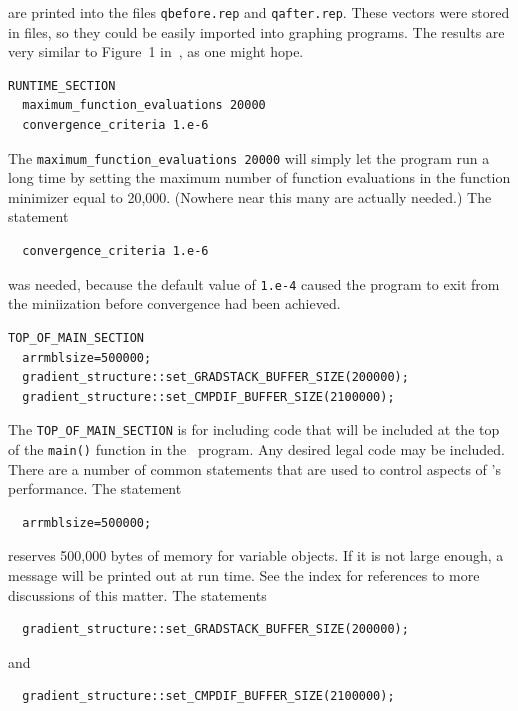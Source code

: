 \documentclass{admbmanual}
\begin{document}
are printed into the files \texttt{qbefore.rep} and \texttt{qafter.rep}.
These vectors were stored in files, so they could be easily imported into 
graphing programs. The results are very similar to Figure~1 in~\cite{hamilton1989},
 as one might hope.
\begin{lstlisting}
RUNTIME_SECTION
  maximum_function_evaluations 20000 
  convergence_criteria 1.e-6 
\end{lstlisting}
The  \texttt{maximum\_function\_evaluations 20000} will simply let the program
run a long time by setting the maximum number of function evaluations
in the function minimizer equal to 20,000. (Nowhere near this many are actually
needed.)
The statement
\begin{lstlisting}
  convergence_criteria 1.e-6
\end{lstlisting}
was needed, because the default value of \texttt{1.e-4} caused the program to 
exit from the miniization before convergence had been achieved.
\begin{lstlisting}
TOP_OF_MAIN_SECTION
  arrmblsize=500000;
  gradient_structure::set_GRADSTACK_BUFFER_SIZE(200000);
  gradient_structure::set_CMPDIF_BUFFER_SIZE(2100000);
\end{lstlisting}
The  \texttt{TOP\_OF\_MAIN\_SECTION} is for including code that
will be included at the top of the \texttt{main()} function in the
\cplus\ program. Any desired legal code may be included. There are
a number of common statements that are used to control aspects
of \ADM's performance. 
The statement
\begin{lstlisting}
  arrmblsize=500000;
\end{lstlisting}
reserves 500,000 bytes of memory
for variable objects. If it is not large enough, a message will be printed
out at run time. See the index for references to more
discussions of this matter.
The statements
\begin{lstlisting}
  gradient_structure::set_GRADSTACK_BUFFER_SIZE(200000);
\end{lstlisting}
and
\begin{lstlisting}
  gradient_structure::set_CMPDIF_BUFFER_SIZE(2100000);
\end{lstlisting}
\end{document}

